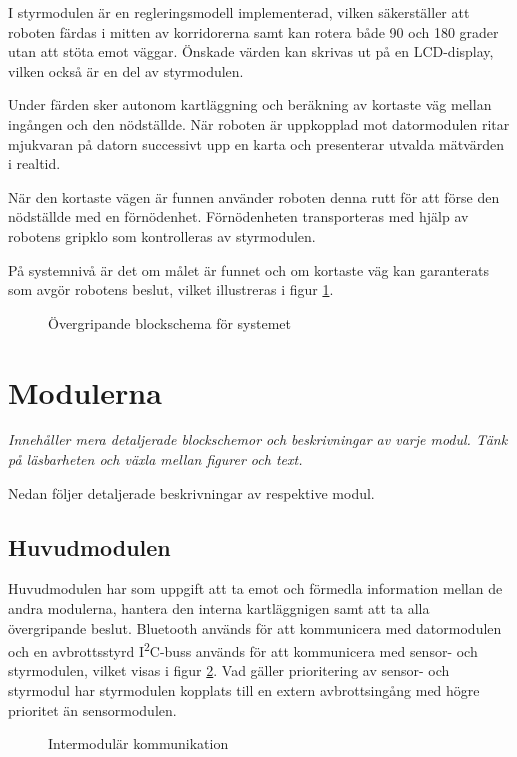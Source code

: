 \documentclass[11pt]{article}
\begin{document}
\begin{flushleft}
I styrmodulen är en regleringsmodell implementerad, vilken säkerställer att roboten färdas i mitten av korridorerna samt kan rotera både 90 och 180 grader utan att stöta emot väggar. Önskade värden kan skrivas ut på en LCD-display, vilken också är en del av styrmodulen.

Under färden sker autonom kartläggning och beräkning av kortaste väg mellan ingången och den nödställde. När roboten är uppkopplad mot datormodulen ritar mjukvaran på datorn successivt upp en karta och presenterar utvalda mätvärden i realtid. 

När den kortaste vägen är funnen använder roboten denna rutt för att förse den nödställde med en förnödenhet. Förnödenheten transporteras med hjälp av robotens gripklo som kontrolleras av styrmodulen.

På systemnivå är det om målet är funnet och om kortaste väg kan garanterats som avgör robotens beslut, vilket illustreras i figur \ref{blockSystem}.

\begin{figure}[htbp]
\centering
\noindent\resizebox{1\linewidth}{!}{
	}
	\caption{Övergripande blockschema för systemet}	\label{blockSystem}
\end{figure}

\pagebreak
\section{Modulerna}
\textit{Innehåller mera detaljerade blockschemor och beskrivningar av varje modul. Tänk på läsbarheten och växla mellan figurer och text.}

Nedan följer detaljerade beskrivningar av respektive modul.

\subsection{Huvudmodulen}
Huvudmodulen har som uppgift att ta emot och förmedla information mellan de andra modulerna, hantera den interna kartläggnigen samt att ta alla övergripande beslut. Bluetooth\textsuperscript{\circledR} används för att kommunicera med datormodulen och en avbrottsstyrd I\textsuperscript{2}C-buss används för att kommunicera med sensor- och styrmodulen, vilket visas i figur \ref{communication}. Vad gäller prioritering av sensor- och styrmodul har styrmodulen kopplats till en extern avbrottsingång med högre prioritet än sensormodulen.

\begin{figure}[htbp]
\noindent\resizebox{.97\textwidth}{!}{
	}
	\caption{Intermodulär kommunikation \label{communication}}
\end{figure}


\end{flushleft}
\end{document}
